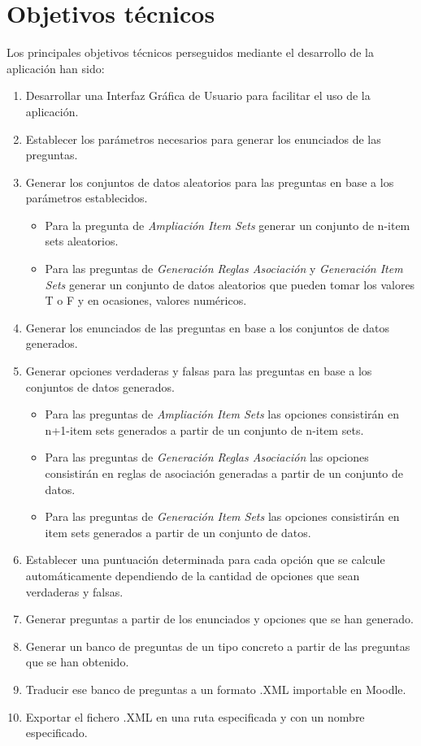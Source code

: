 
\section{Objetivos técnicos}
Los principales objetivos técnicos perseguidos mediante el desarrollo de la aplicación han sido:

\begin{enumerate}
    \item Desarrollar una Interfaz Gráfica de Usuario para facilitar el uso de la aplicación.
    \item Establecer los parámetros necesarios para generar los enunciados de las preguntas.
    \item Generar los conjuntos de datos aleatorios para las preguntas en base a los parámetros establecidos.
    \begin{itemize}
    \item Para la pregunta de \textit{Ampliación Item Sets} generar un conjunto de n-item sets aleatorios.
    \item Para las preguntas de \textit{Generación Reglas Asociación} y \textit{Generación Item Sets} generar un conjunto de datos aleatorios que pueden tomar los valores T o F y en ocasiones, valores numéricos.
    \end{itemize}
    \item Generar los enunciados de las preguntas en base a los conjuntos de datos generados.
    \item Generar opciones verdaderas y falsas para las preguntas en base a los conjuntos de datos generados.
    \begin{itemize}
    \item Para las preguntas de \textit{Ampliación Item Sets} las opciones consistirán en n+1-item sets generados a partir de un conjunto de n-item sets.
    \item Para las preguntas de \textit{Generación Reglas Asociación} las opciones consistirán en reglas de asociación generadas a partir de un conjunto de datos.
    \item Para las preguntas de \textit{Generación Item Sets} las opciones consistirán en item sets generados a partir de un conjunto de datos.
    \end{itemize}
    \item Establecer una puntuación determinada para cada opción que se calcule automáticamente dependiendo de la cantidad de opciones que sean verdaderas y falsas.
    \item Generar preguntas a partir de los enunciados y opciones que se han generado.
    \item Generar un banco de preguntas de un tipo concreto a partir de las preguntas que se han obtenido.
    \item Traducir ese banco de preguntas a un formato .XML importable en Moodle.
    \item Exportar el fichero .XML en una ruta especificada y con un nombre especificado.
\end{enumerate}


